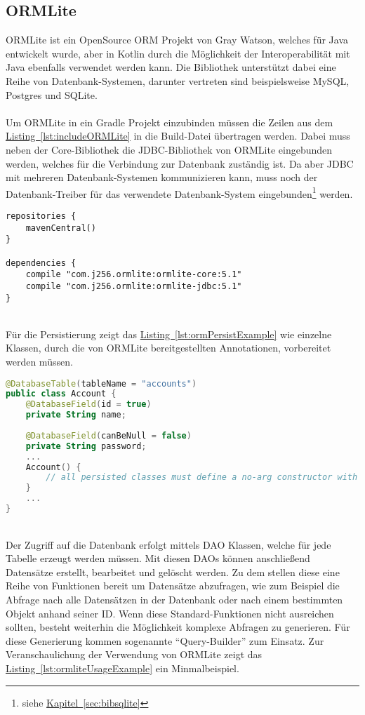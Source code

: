 \subsection{ORMLite}\label{sec:bibormlite}
ORMLite ist ein OpenSource \gls{ORM} Projekt von Gray Watson, welches für Java entwickelt wurde, aber in Kotlin durch die Möglichkeit der Interoperabilität mit Java ebenfalls verwendet werden kann. Die Bibliothek unterstützt dabei eine Reihe von Datenbank-Systemen, darunter vertreten sind beispielsweise MySQL, Postgres und SQLite.\\
\\
Um ORMLite in ein Gradle Projekt einzubinden müssen die Zeilen aus dem \hyperref[lst:includeORMLite]{Listing~\ref{lst:includeORMLite}} in die Build-Datei übertragen werden. Dabei muss neben der Core-Bibliothek die \gls{JDBC}-Bibliothek von ORMLite eingebunden werden, welches für die Verbindung zur Datenbank zuständig ist. Da aber \gls{JDBC} mit mehreren Datenbank-Systemen kommunizieren kann, muss noch der Datenbank-Treiber für das verwendete Datenbank-System eingebunden\footnote{siehe \hyperref[sec:bibsqlite]{Kapitel~\ref{sec:bibsqlite}}} werden.
\\
\begin{lstlisting}[style=lstStyleFramed, language=Gradle, caption={Einbindung der Bibliothek ORMLite mithilfe von Gradle}, label=lst:includeORMLite, float]
repositories {
	mavenCentral()
}

dependencies {
	compile "com.j256.ormlite:ormlite-core:5.1"
	compile "com.j256.ormlite:ormlite-jdbc:5.1"
}
\end{lstlisting}
\\
Für die Persistierung zeigt das \hyperref[lst:ormPersistExample]{Listing~\ref{lst:ormPersistExample}} wie einzelne Klassen, durch die von ORMLite bereitgestellten Annotationen, vorbereitet werden müssen.
\\
\begin{lstlisting}[style=lstStyleFramed, language=Kotlin, caption={Beispiel: Persistierung einer Klasse mittels ORMLite \cite{ormlite}},label=lst:ormPersistExample, float]
@DatabaseTable(tableName = "accounts")
public class Account {
	@DatabaseField(id = true)
	private String name;
	
	@DatabaseField(canBeNull = false)
	private String password;
	...
	Account() {
		// all persisted classes must define a no-arg constructor with at least package visibility
	}
	...    
}
\end{lstlisting}
\\
Der Zugriff auf die Datenbank erfolgt mittels \gls{DAO} Klassen, welche für jede Tabelle erzeugt werden müssen. Mit diesen \glspl{DAO} können anschließend Datensätze erstellt, bearbeitet und gelöscht werden. Zu dem stellen diese eine Reihe von Funktionen bereit um Datensätze abzufragen, wie zum Beispiel die Abfrage nach alle Datensätzen in der Datenbank oder nach einem bestimmten Objekt anhand seiner ID. Wenn diese Standard-Funktionen nicht ausreichen sollten, besteht weiterhin die Möglichkeit komplexe Abfragen zu generieren. Für diese Generierung kommen sogenannte \enquote{Query-Builder} zum Einsatz. Zur Veranschaulichung der Verwendung von ORMLite zeigt das \hyperref[lst:ormliteUsageExample]{Listing~\ref{lst:ormliteUsageExample}} ein Minmalbeispiel.
